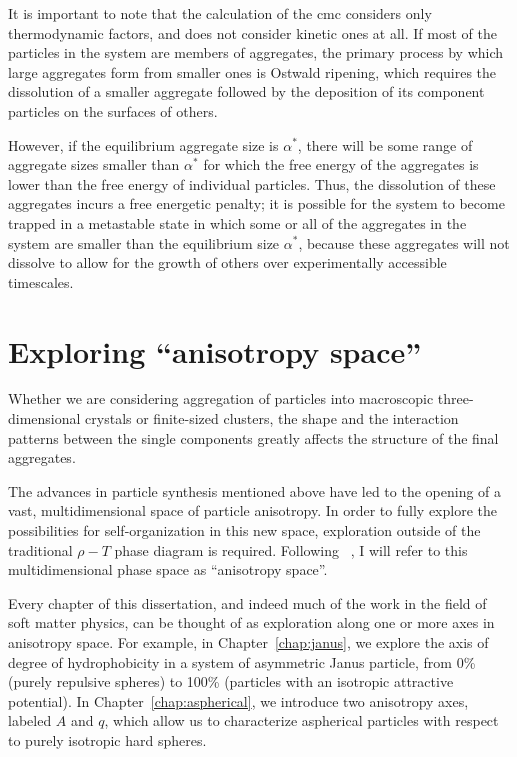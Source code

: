 It is important to note that the calculation of the cmc considers only thermodynamic factors, and does not consider kinetic ones at all.
If most of the particles in the system are members of aggregates, the primary process by which large aggregates form from smaller ones is Ostwald ripening,
which requires the dissolution of a smaller aggregate followed by the deposition of its component particles on the surfaces of others.

However, if the equilibrium aggregate size is $\alpha^*$, there will be some range of aggregate sizes smaller than $\alpha^*$ for which the free energy of the aggregates is lower than the free energy of individual particles.
Thus, the dissolution of these aggregates incurs a free energetic penalty; it is possible for the system to become trapped in a metastable state in which some or all of the aggregates in the system are smaller than the equilibrium size $\alpha^*$, because these aggregates will not dissolve to allow for the growth of others over experimentally accessible timescales.

\section{Exploring ``anisotropy space''}\label{sec:anisotropy}
Whether we are considering aggregation of particles into macroscopic three-dimensional crystals or finite-sized clusters, the shape and the interaction patterns between the single components greatly affects the structure of the final aggregates.

The advances in particle synthesis mentioned above have led to the opening of a vast, multidimensional space of particle anisotropy.
In order to fully explore the possibilities for self-organization in this new space, exploration outside of the traditional $\rho-T$ phase diagram is required.
Following \citeauthor{glotzer}~\cite{glotzer}, I will refer to this multidimensional phase space as ``anisotropy space''.

Every chapter of this dissertation, and indeed much of the work in the field of soft matter physics, can be thought of as exploration along one or more axes in anisotropy space.
For example, in Chapter~\ref{chap:janus}, we explore the axis of degree of hydrophobicity in a system of asymmetric Janus particle, from 0\% (purely repulsive spheres) to 100\% (particles with an isotropic attractive potential).
In Chapter~\ref{chap:aspherical}, we introduce two anisotropy axes, labeled $A$ and $q$, which allow us to characterize aspherical particles with respect to purely isotropic hard spheres.

